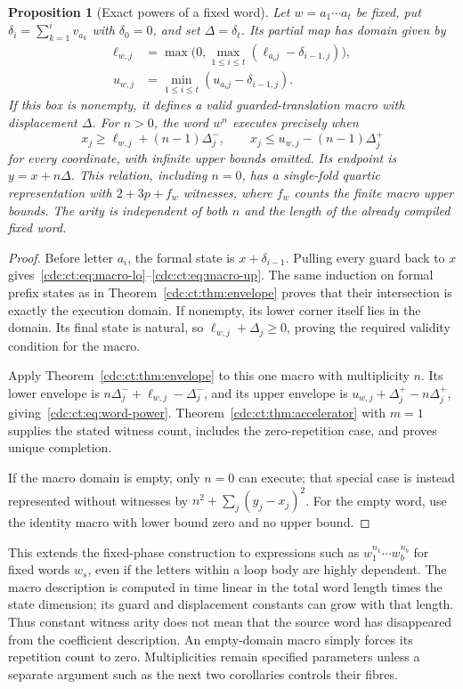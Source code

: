 \documentclass[11pt,a4paper]{article}
\newtheorem{proposition}[proposition]{Proposition}
\theoremstyle{definition}
\theoremstyle{remark}
\begin{document}
\begin{proposition}[Exact powers of a fixed word]\label{cdc:ct:prop:word-power}
Let $w=a_1\cdots a_t$ be fixed, put $\delta_i=\sum_{k=1}^i v_{a_k}$ with $\delta_0=0$, and set $\Delta=\delta_t$. Its partial map has domain given by
\begin{align}
 \ell_{w,j}&=\max\bigl(0,\max_{1\le i\le t}(\ell_{a_i j}-\delta_{i-1,j})\bigr),\label{cdc:ct:eq:macro-lo}\\
 u_{w,j}&=\min_{1\le i\le t}(u_{a_i j}-\delta_{i-1,j}).\label{cdc:ct:eq:macro-up}
\end{align}
If this box is nonempty, it defines a valid guarded-translation macro with displacement $\Delta$. For $n>0$, the word $w^n$ executes precisely when
\begin{equation}\label{cdc:ct:eq:word-power}
 x_j\ge\ell_{w,j}+(n-1)\Delta_j^-,\qquad
 x_j\le u_{w,j}-(n-1)\Delta_j^+
\end{equation}
for every coordinate, with infinite upper bounds omitted. Its endpoint is $y=x+n\Delta$. This relation, including $n=0$, has a single-fold quartic representation with $2+3p+f_w$ witnesses, where $f_w$ counts the finite macro upper bounds. The arity is independent of both $n$ and the length of the already compiled fixed word.
\end{proposition}
\begin{proof}
Before letter $a_i$, the formal state is $x+\delta_{i-1}$. Pulling every guard back to $x$ gives~\eqref{cdc:ct:eq:macro-lo}--\eqref{cdc:ct:eq:macro-up}. The same induction on formal prefix states as in Theorem~\ref{cdc:ct:thm:envelope} proves that their intersection is exactly the execution domain. If nonempty, its lower corner itself lies in the domain. Its final state is natural, so $\ell_{w,j}+\Delta_j\ge0$, proving the required validity condition for the macro.

Apply Theorem~\ref{cdc:ct:thm:envelope} to this one macro with multiplicity $n$. Its lower envelope is $n\Delta_j^-+\ell_{w,j}-\Delta_j^-$, and its upper envelope is $u_{w,j}+\Delta_j^+-n\Delta_j^+$, giving~\eqref{cdc:ct:eq:word-power}. Theorem~\ref{cdc:ct:thm:accelerator} with $m=1$ supplies the stated witness count, includes the zero-repetition case, and proves unique completion.

If the macro domain is empty, only $n=0$ can execute; that special case is instead represented without witnesses by $n^2+\sum_j(y_j-x_j)^2$. For the empty word, use the identity macro with lower bound zero and no upper bound.
\end{proof}
This extends the fixed-phase construction to expressions such as $w_1^{n_1}\cdots w_b^{n_b}$ for fixed words $w_s$, even if the letters within a loop body are highly dependent. The macro description is computed in time linear in the total word length times the state dimension; its guard and displacement constants can grow with that length. Thus constant witness arity does not mean that the source word has disappeared from the coefficient description. An empty-domain macro simply forces its repetition count to zero. Multiplicities remain specified parameters unless a separate argument such as the next two corollaries controls their fibres.
\end{document}
